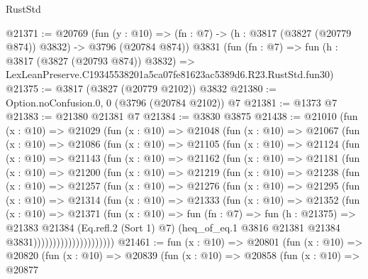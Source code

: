 \begin{lexlean}{RustStd}
\begin{coremodule}
@21371 := @20769
    (fun (y : @10) => (fn : @7) -> (h : @3817 (@3827 (@20779 @874)) @3832) -> @3796 (@20784 @874))
    @3831
    (fun (fn : @7) =>
    fun (h : @3817 (@3827 (@20793 @874)) @3832) =>
    LexLeanPreserve.C19345538201a5ca07fe81623ac5389d6.R23.RustStd.fun30)
@21375 := @3817 (@3827 (@20779 @2102)) @3832
@21380 := Option.noConfusion.{0, 0} (@3796 (@20784 @2102)) @7
@21381 := @1373 @7
@21383 := @21380 @21381 @7
@21384 := @3830 @3875
@21438 := @21010
    (fun (x : @10) =>
    @21029
      (fun (x : @10) =>
      @21048
        (fun (x : @10) =>
        @21067
          (fun (x : @10) =>
          @21086
            (fun (x : @10) =>
            @21105
              (fun (x : @10) =>
              @21124
                (fun (x : @10) =>
                @21143
                  (fun (x : @10) =>
                  @21162
                    (fun (x : @10) =>
                    @21181
                      (fun (x : @10) =>
                      @21200
                        (fun (x : @10) =>
                        @21219
                          (fun (x : @10) =>
                          @21238
                            (fun (x : @10) =>
                            @21257
                              (fun (x : @10) =>
                              @21276
                                (fun (x : @10) =>
                                @21295
                                  (fun (x : @10) =>
                                  @21314
                                    (fun (x : @10) =>
                                    @21333
                                      (fun (x : @10) =>
                                      @21352
                                        (fun (x : @10) =>
                                        @21371
                                          (fun (x : @10) =>
                                          fun (fn : @7) =>
                                          fun (h : @21375) =>
                                          @21383
                                            @21384
                                            (Eq.refl.{2} (Sort 1) @7)
                                            (heq_of_eq.{1}
                                              @3816
                                              @21381
                                              @21384
                                              @3831)))))))))))))))))))))
@21461 := fun (x : @10) =>
  @20801
    (fun (x : @10) =>
    @20820
      (fun (x : @10) =>
      @20839
        (fun (x : @10) =>
        @20858
          (fun (x : @10) =>
          @20877

\end{coremodule}
\end{lexlean}
